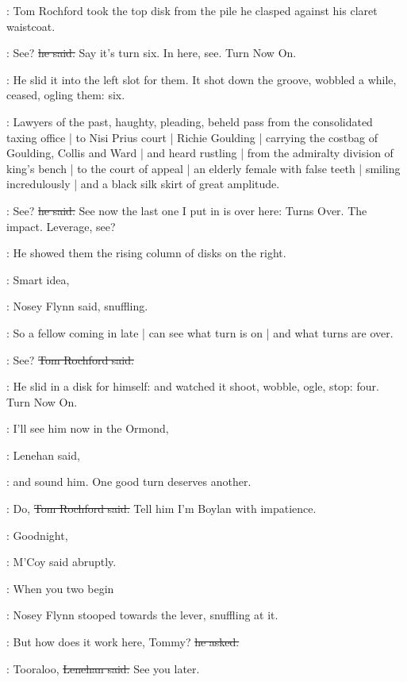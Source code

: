 :
Tom Rochford took the top disk from the pile
he clasped against his claret waistcoat.

\rochford:
See?
\sout{he said.}
Say it's turn six.
In here, see.
Turn Now On.

:
He slid it into the left slot for them.
It shot down the groove,
wobbled a while,
ceased,
ogling them:
six.

\begin{mdframed}
    :
    Lawyers of the past, haughty, pleading,
    beheld pass from the consolidated taxing office |
    to Nisi Prius court |
    Richie Goulding |
    carrying the costbag of Goulding, Collis and Ward |
    and heard rustling |
    from the admiralty division of king's bench |
    to the court of appeal |
    an elderly female with false teeth |
    smiling incredulously |
    and a black silk skirt of great amplitude.
\end{mdframed}

\rochford:
See?
\sout{he said.}
See now the last one I put in is over here:
Turns Over.
The impact. Leverage, see?

:
He showed them the rising column of disks on the right.

\nosey:
Smart idea,

:
Nosey Flynn said, snuffling.

\nosey:
So a fellow coming in late |
can see what turn is on |
and what turns are over.

\rochford:
See?
\sout{Tom Rochford said.}

:
He slid in a disk for himself:
and watched it
shoot,
wobble,
ogle,
stop:
four.
Turn Now On.

\lenehan:
I'll see him now in the Ormond,

:
Lenehan said,

\lenehan:
and sound him.
One good turn deserves another.

\rochford:
Do,
\sout{Tom Rochford said.}
Tell him I'm Boylan with impatience.

\mcoy:
Goodnight,

:
M'Coy said abruptly.

\mcoy:
When you two begin

:
Nosey Flynn stooped towards the lever,
snuffling at it.

\nosey:
But how does it work here, Tommy?
\sout{he asked.}

\lenehan:
Tooraloo,
\sout{Lenehan said.}
See you later.

